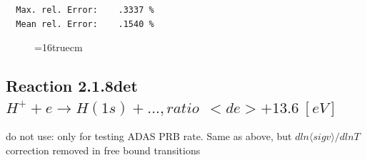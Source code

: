 \documentclass[12pt,dvips]{article}
\begin{document}
\begin{small}
\begin{verbatim}
  Max. rel. Error:    .3337 %
  Mean rel. Error:    .1540 %

\end{verbatim}\end{small}
\begin{figure} \label{2.1.8lr2}
\epsfxsize=16truecm
\end{figure}
\newpage

\subsection{
  Reaction 2.1.8det  $H^+  + e \rightarrow H(1s) + ..., ratio ~ \  <de> + 13.6 \ [eV] $
}

     do not use: only for testing  ADAS PRB rate. Same as above,
     but $dln\langle sig v\rangle /dlnT$ correction removed in free bound transitions
\end{document}
